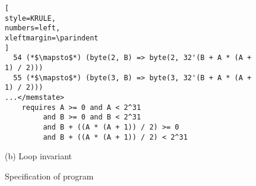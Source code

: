 \begin{figure}
\begin{lstlisting}[
style=KRULE,
numbers=left,
xleftmargin=\parindent
]
  54 (*$\mapsto$*) (byte(2, B) => byte(2, 32'(B + A * (A + 1) / 2)))
  55 (*$\mapsto$*) (byte(3, B) => byte(3, 32'(B + A * (A + 1) / 2)))
...</memstate>
    requires A >= 0 and A < 2^31
         and B >= 0 and B < 2^31
         and B + ((A * (A + 1)) / 2) >= 0  
         and B + ((A * (A + 1)) / 2) < 2^31
\end{lstlisting}
\begin{center}
\vspace{-5pt}
{\small (b) Loop invariant}
\vspace{-5pt}
\end{center}
\vspace*{-4pt}
\caption{Specification of  program}
\vspace{-15pt}
\label{fig:sum-to-n-spec}
\end{figure}

